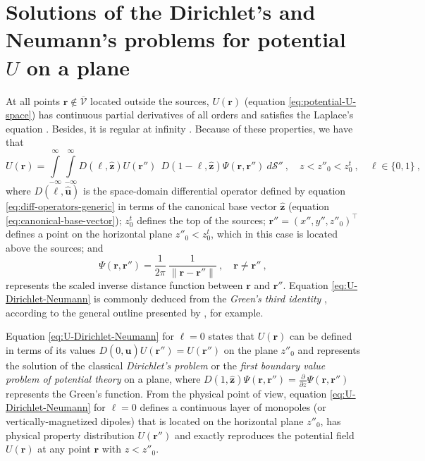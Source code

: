 \section{Solutions of the Dirichlet's and Neumann's problems for potential $U$ on a plane}
\label{sec:dirichlet_neumann}

At all points $\mathbf{r} \notin \overline{\mathcal{V}}$ 
located outside the sources, $U(\mathbf{r})$ (equation
\ref{eq:potential-U-space}) has continuous partial derivatives of all orders
and satisfies the Laplace's equation \citep[][ p. 122--124]{kellogg1967}.
Besides, it is regular at infinity \citep[][ p. 217]{kellogg1967}.
Because of these properties, we have that
\begin{equation}
	U(\mathbf{r}) = 
	\int\limits_{-\infty}^{\infty} \int\limits_{-\infty}^{\infty}
	D(\ell, \hat{\mathbf{z}}) U(\mathbf{r}'') \:\: 
	D(1 - \ell, \hat{\mathbf{z}}) \Psi(\mathbf{r}, \mathbf{r}'')
	\: d\mathcal{S}'' \: , \quad z < z''_{0} < z^{t}_{0} \: ,
	\quad \ell \in \{0, 1\} \: ,
	\label{eq:U-Dirichlet-Neumann}
\end{equation}
where $D(\ell, \hat{\mathbf{u}})$ is the space-domain differential operator 
defined by equation \ref{eq:diff-operators-generic} in terms of the canonical base vector 
$\hat{\mathbf{z}}$ (equation \ref{eq:canonical-base-vector}); 
$z^{t}_{0}$ defines the top of the sources; 
$\mathbf{r}'' = (x'', y'', z''_{0})^{\top}$ defines a point  
on the horizontal plane $z''_{0} < z^{t}_{0}$, which in this case is located above the sources; and 
\begin{equation}
	\Psi(\mathbf{r}, \mathbf{r}'') = 
	\frac{1}{2\pi} \: 
	\frac{1}{\| \mathbf{r} - \mathbf{r}'' \|} \: , 
	\quad \mathbf{r} \ne \mathbf{r}'' \: ,
	\label{eq:Psi}
\end{equation}
represents the scaled inverse distance function between $\mathbf{r}$ and $\mathbf{r}''$. 
Equation \ref{eq:U-Dirichlet-Neumann} is commonly deduced from 
the \textit{Green's third identity} \citep[][ p. 219]{kellogg1967}, according to
the general outline presented by \cite{roy1962}, for example.

Equation \ref{eq:U-Dirichlet-Neumann} for $\ell = 0$ states that $U(\mathbf{r})$ can be defined
in terms of its values $D(0, \hat{\mathbf{u}}) U(\mathbf{r}'') = U(\mathbf{r}'')$ on the plane $z''_{0}$ and 
represents the solution of the classical \textit{Dirichlet’s problem} or the 
\textit{first boundary value problem of potential theory} \cite[][ p. 236]{kellogg1967} on a plane, where 
$D(1, \hat{\mathbf{z}}) \Psi(\mathbf{r}, \mathbf{r}'') = \tfrac{\partial}{\partial z} \Psi(\mathbf{r}, \mathbf{r}'')$ 
represents the Green's function.
From the physical point of view, equation \ref{eq:U-Dirichlet-Neumann} for $\ell = 0$ defines a continuous 
layer of monopoles (or vertically-magnetized dipoles) that is located on the horizontal plane $z''_{0}$, has 
physical property distribution $U(\mathbf{r}'')$ and exactly reproduces the 
potential field $U(\mathbf{r})$ at any point $\mathbf{r}$ with $z < z''_{0}$.

